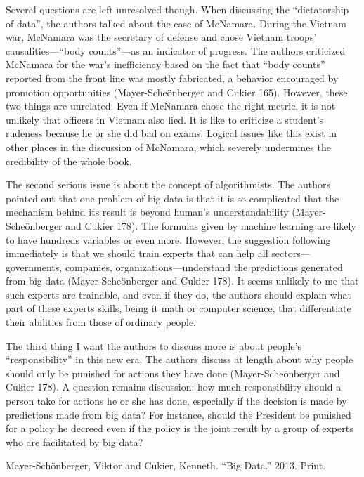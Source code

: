\documentclass{writing}
\begin{document}
Several questions are left unresolved though. When discussing the
``dictatorship of data'', the authors talked about the case of McNamara.
During the Vietnam war, McNamara was the secretary of defense and chose
Vietnam troops' causalities---``body counts''---as an indicator of
progress. The authors criticized McNamara for the war's inefficiency
based on the fact that ``body counts'' reported from the front line was
mostly fabricated, a behavior encouraged by promotion opportunities
(Mayer-Scheönberger and Cukier 165). However, these two things are
unrelated. Even if McNamara chose the right metric, it is not unlikely
that officers in Vietnam also lied. It is like to criticize a student's
rudeness because he or she did bad on exams. Logical issues like this
exist in other places in the discussion of McNamara, which severely
undermines the credibility of the whole book.

The second serious issue is about the concept of algorithmists. The
authors pointed out that one problem of big data is that it is so
complicated that the mechanism behind its result is beyond human's
understandability (Mayer-Scheönberger and Cukier 178). The formulas
given by machine learning are likely to have hundreds variables or even
more. However, the suggestion following immediately is that we should
train experts that can help all sectors---governments, companies,
organizations---understand the predictions generated from big data
(Mayer-Scheönberger and Cukier 178). It seems unlikely to me that such
experts are trainable, and even if they do, the authors should explain
what part of these experts skills, being it math or computer science,
that differentiate their abilities from those of ordinary people.

The third thing I want the authors to discuss more is about people's
``responsibility'' in this new era. The authors discuss at length about
why people should only be punished for actions they have done
(Mayer-Scheönberger and Cukier 178). A question remains discussion: how
much responsibility should a person take for actions he or she has done,
especially if the decision is made by predictions made from big data?
For instance, should the President be punished for a policy he decreed
even if the policy is the joint result by a group of experts who are
facilitated by big data?

\begin{references}
\item
  Mayer-Schönberger, Viktor and Cukier, Kenneth. ``Big Data.'' 2013. Print.
\end{references}
\end{document}
